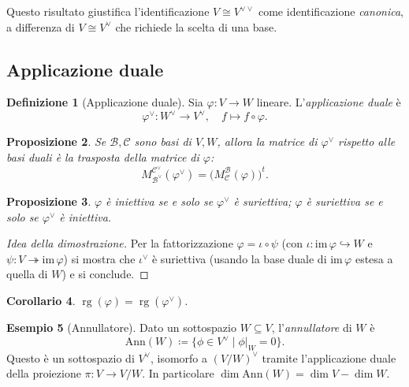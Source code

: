 \documentclass[11pt, a4paper]{book}
\theoremstyle{definition}
\newtheorem{definizione}{Definizione}[section]
\newtheorem{esempio}[definizione]{Esempio}
\theoremstyle{plain}
\newtheorem{proposizione}[definizione]{Proposizione}
\newtheorem{corollario}[definizione]{Corollario}
\theoremstyle{remark}
\newcommand{\im}{\mathrm{im}\,}
\DeclareMathOperator{\rg}{rg}
\newcommand{\Ann}{\mathrm{Ann}}
\begin{document}
Questo risultato giustifica l'identificazione $V \cong V^{\vee\vee}$ come identificazione \emph{canonica}, a differenza di $V \cong V^\vee$ che richiede la scelta di una base.

\subsection{Applicazione duale}

\begin{defbox}
\begin{definizione}[Applicazione duale]
Sia $\varphi \colon V \to W$ lineare. L'\emph{applicazione duale} è
\[
  \varphi^\vee \colon W^\vee \to V^\vee, \quad f \mapsto f \circ \varphi.
\]
\end{definizione}
\end{defbox}

\begin{proposizione}
Se $\mathcal{B}, \mathcal{C}$ sono basi di $V, W$, allora la matrice di $\varphi^\vee$ rispetto alle basi duali è la trasposta della matrice di $\varphi$:
\[
  M^{\mathcal{C}^\vee}_{\mathcal{B}^\vee}(\varphi^\vee) = \bigl(M^\mathcal{B}_\mathcal{C}(\varphi)\bigr)^t.
\]
\end{proposizione}

\begin{proposizione}
$\varphi$ è iniettiva se e solo se $\varphi^\vee$ è suriettiva; $\varphi$ è suriettiva se e solo se $\varphi^\vee$ è iniettiva.
\end{proposizione}

\begin{proof}[Idea della dimostrazione]
Per la fattorizzazione $\varphi = \iota \circ \psi$ (con $\iota \colon \im\varphi \hookrightarrow W$ e $\psi \colon V \twoheadrightarrow \im\varphi$) si mostra che $\iota^\vee$ è suriettiva (usando la base duale di $\im\varphi$ estesa a quella di $W$) e si conclude.
\end{proof}

\begin{corollario}
$\rg(\varphi) = \rg(\varphi^\vee)$.
\end{corollario}

\begin{exbox}
\begin{esempio}[Annullatore]
Dato un sottospazio $W \subseteq V$, l'\emph{annullatore} di $W$ è
\[
  \Ann(W) \coloneqq \{\phi \in V^\vee \mid \phi|_W = 0\}.
\]
Questo è un sottospazio di $V^\vee$, isomorfo a $(V/W)^\vee$ tramite l'applicazione duale della proiezione $\pi \colon V \to V/W$. In particolare $\dim \Ann(W) = \dim V - \dim W$.
\end{esempio}
\end{exbox}
\end{document}
